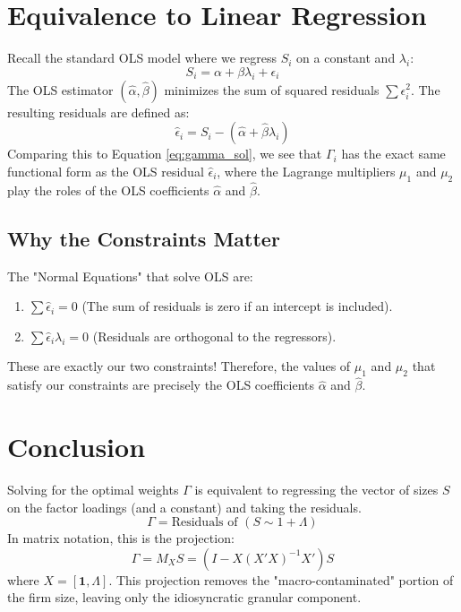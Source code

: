 \documentclass[11pt]{article}
\begin{document}
\section{Equivalence to Linear Regression}
Recall the standard OLS model where we regress $S_i$ on a constant and $\lambda_i$:
\begin{equation}
S_i = \alpha + \beta \lambda_i + \epsilon_i
\end{equation}
The OLS estimator $(\hat{\alpha}, \hat{\beta})$ minimizes the sum of squared residuals $\sum \epsilon_i^2$. The resulting residuals are defined as:
\begin{equation}
\hat{\epsilon}_i = S_i - (\hat{\alpha} + \hat{\beta} \lambda_i)
\end{equation}
Comparing this to Equation \ref{eq:gamma_sol}, we see that $\Gamma_i$ has the exact same functional form as the OLS residual $\hat{\epsilon}_i$, where the Lagrange multipliers $\mu_1$ and $\mu_2$ play the roles of the OLS coefficients $\hat{\alpha}$ and $\hat{\beta}$.

\subsection{Why the Constraints Matter}
The "Normal Equations" that solve OLS are:
\begin{enumerate}
    \item $\sum \hat{\epsilon}_i = 0$ (The sum of residuals is zero if an intercept is included).
    \item $\sum \hat{\epsilon}_i \lambda_i = 0$ (Residuals are orthogonal to the regressors).
\end{enumerate}
These are exactly our two constraints! Therefore, the values of $\mu_1$ and $\mu_2$ that satisfy our constraints are precisely the OLS coefficients $\hat{\alpha}$ and $\hat{\beta}$.

\section{Conclusion}
Solving for the optimal weights $\Gamma$ is equivalent to regressing the vector of sizes $S$ on the factor loadings (and a constant) and taking the residuals. 
\begin{equation}
\Gamma = \text{Residuals of } (S \sim 1 + \Lambda)
\end{equation}
In matrix notation, this is the projection:
\begin{equation}
\Gamma = M_X S = (I - X(X'X)^{-1}X')S
\end{equation}
where $X = [\mathbf{1}, \Lambda]$. This projection removes the "macro-contaminated" portion of the firm size, leaving only the idiosyncratic granular component.
\end{document}
